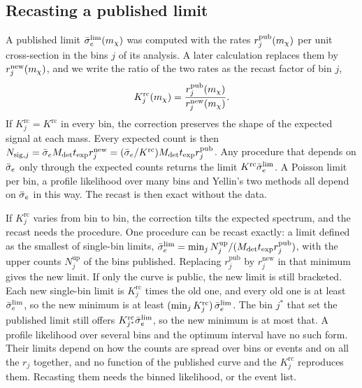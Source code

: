 \subsection{Recasting a published limit}\label{sec:21.5-recast}

A published limit $\bar{\sigma}_{e}^{\mathrm{lim}}(m_{\chi})$ was computed with the rates $r_j^{\mathrm{pub}}(m_{\chi})$ per unit cross-section in the bins $j$ of its analysis. A later calculation replaces them by $r_j^{\mathrm{new}}(m_{\chi})$, and we write the ratio of the two rates as the recast factor of bin $j$,
\begin{equation}
  K^{\mathrm{rc}}_j(m_{\chi}) = \frac{r_j^{\mathrm{pub}}(m_{\chi})}{r_j^{\mathrm{new}}(m_{\chi})} .
  \label{eq:21.5-K}
\end{equation}
If $K^{\mathrm{rc}}_j = K^{\mathrm{rc}}$ in every bin, the correction preserves the shape of the expected signal at each mass. Every expected count is then $N_{\mathrm{sig},j} = \bar{\sigma}_{e} M_{\mathrm{det}}t_{\mathrm{exp}}r_j^{\mathrm{new}} = (\bar{\sigma}_{e}/K^{\mathrm{rc}})M_{\mathrm{det}}t_{\mathrm{exp}}r_j^{\mathrm{pub}}$. Any procedure that depends on $\bar{\sigma}_{e}$ only through the expected counts returns the limit $K^{\mathrm{rc}}\bar{\sigma}_{e}^{\mathrm{lim}}$. A Poisson limit per bin, a profile likelihood over many bins and Yellin's two methods all depend on $\bar{\sigma}_{e}$ in this way. The recast is then exact without the data.

If $K^{\mathrm{rc}}_j$ varies from bin to bin, the correction tilts the expected spectrum, and the recast needs the procedure. One procedure can be recast exactly: a limit defined as the smallest of single-bin limits, $\bar{\sigma}_{e}^{\mathrm{lim}} = \min_jN_j^{\mathrm{up}}/(M_{\mathrm{det}}t_{\mathrm{exp}}r_j^{\mathrm{pub}})$, with the upper counts $N_j^{\mathrm{up}}$ of the bins published. Replacing $r_j^{\mathrm{pub}}$ by $r_j^{\mathrm{new}}$ in that minimum gives the new limit. If only the curve is public, the new limit is still bracketed. Each new single-bin limit is $K^{\mathrm{rc}}_j$ times the old one, and every old one is at least $\bar{\sigma}_{e}^{\mathrm{lim}}$, so the new minimum is at least $(\min_jK^{\mathrm{rc}}_j)\,\bar{\sigma}_{e}^{\mathrm{lim}}$. The bin $j^*$ that set the published limit still offers $K^{\mathrm{rc}}_{j^*}\bar{\sigma}_{e}^{\mathrm{lim}}$, so the new minimum is at most that. A profile likelihood over several bins and the optimum interval have no such form. Their limits depend on how the counts are spread over bins or events and on all the $r_j$ together, and no function of the published curve and the $K^{\mathrm{rc}}_j$ reproduces them. Recasting them needs the binned likelihood, or the event list.

